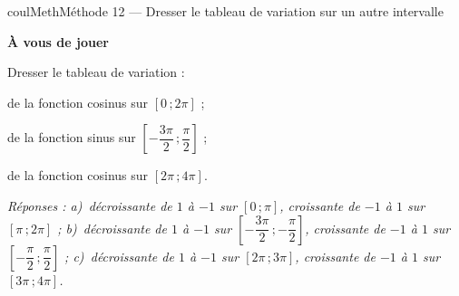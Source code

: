\documentclass[11pt,a4paper]{article}
\makeatletter
\newcommand{\lycee@intff}[2]{\left[#1\,;#2\right]}
\providecommand{\intff}{\lycee@intff}%
\newcounter{lycee@signet}
\newcommand{\signet}[3][]{\stepcounter{lycee@signet}%
  \edef\lycee@dest{\if\relax\detokenize{#1}\relax
    signet.\arabic{lycee@signet}\else#1\fi}%
  \hypertarget{\lycee@dest}{}\bookmark[level=#2,dest=\lycee@dest]{#3}}
\newcounter{methode}
\newenvironment{methodebox}[1][Méthode]{\stepcounter{methode}%
  \begin{boitecours}[phantom={\signet[methode-\arabic{methode}]{2}{#1}}]{coulMeth}{#1}}%
  {\end{boitecours}}
\newcommand{\etape}[1]{\par\smallskip\textbf{\color{coulMeth}#1}\par\nobreak\smallskip}
\newcommand{\reponse}[1]{\par\smallskip
  {\footnotesize\itshape\color{black!55}Réponses : #1}}
\makeatother
\begin{document}
\begin{methodebox}[Méthode 12 --- Dresser le tableau de variation sur un autre intervalle]
\etape{À vous de jouer}
Dresser le tableau de variation :
\begin{questions}[label=\alph*)]
  \item de la fonction cosinus sur $\intff{0}{2\pi}$ ;
  \item de la fonction sinus sur $\intff{-\dfrac{3\pi}{2}}{\dfrac{\pi}{2}}$ ;
  \item de la fonction cosinus sur $\intff{2\pi}{4\pi}$.
\end{questions}
\reponse{a)~décroissante de $1$ à $-1$ sur $\intff{0}{\pi}$, croissante de $-1$ à $1$ sur $\intff{\pi}{2\pi}$ ;\;
b)~décroissante de $1$ à $-1$ sur $\intff{-\dfrac{3\pi}{2}}{-\dfrac{\pi}{2}}$, croissante de $-1$ à $1$ sur $\intff{-\dfrac{\pi}{2}}{\dfrac{\pi}{2}}$ ;\;
c)~décroissante de $1$ à $-1$ sur $\intff{2\pi}{3\pi}$, croissante de $-1$ à $1$ sur $\intff{3\pi}{4\pi}$.}
\end{methodebox}
\end{document}
